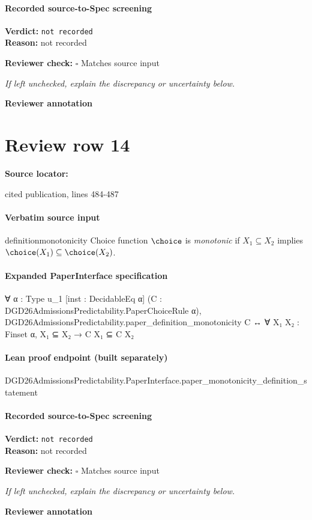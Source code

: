 \documentclass[10pt]{article}
\newcommand{\reviewerbox}{%
  \par\noindent\fbox{\parbox{0.96\linewidth}{\rule{0pt}{0.38in}}}\par
}
\newcommand{\reviewmatch}[1]{%
  \par\noindent\textbf{Reviewer check:} $\square$\; #1\par
  \noindent\emph{If left unchecked, explain the discrepancy or uncertainty below.}\par
}
\begin{document}
\paragraph{Recorded source-to-Spec screening}
\textbf{Verdict:} \texttt{not recorded}
\\
\textbf{Reason:} not recorded
\reviewmatch{Matches source input}
\noindent\textbf{Reviewer annotation}\par
\reviewerbox
\clearpage
\hypertarget{source-claim-1b6dc1033989d2bf}{}
\section*{Review row 14}
\textbf{Source locator:} {\footnotesize\raggedright cited publication, lines 484-\allowbreak{}487\par}
\paragraph{Verbatim source input}
\begin{ReviewVerbatim}
\begin{restatable}[Monotonicity]{definition}{monotonicity}
\label{def:monotonicity}
Choice function $\choice$ is \textit{monotonic} if $X_1 \subseteq X_2$ implies $\choice(X_1) \subseteq \choice(X_2)$.
\end{restatable}
\end{ReviewVerbatim}


\paragraph{Expanded PaperInterface specification}
\begin{ReviewVerbatim}
∀ {α : Type u_1} [inst : DecidableEq α] (C : DGD26AdmissionsPredictability.PaperChoiceRule α),
  DGD26AdmissionsPredictability.paper_definition_monotonicity C ↔ ∀ {X₁ X₂ : Finset α}, X₁ ⊆ X₂ → C X₁ ⊆ C X₂
\end{ReviewVerbatim}

\paragraph{Lean proof endpoint (built separately)}\begin{ReviewVerbatim}
DGD26AdmissionsPredictability.PaperInterface.paper_monotonicity_definition_statement
\end{ReviewVerbatim}

\paragraph{Recorded source-to-Spec screening}
\textbf{Verdict:} \texttt{not recorded}
\\
\textbf{Reason:} not recorded
\reviewmatch{Matches source input}
\noindent\textbf{Reviewer annotation}\par
\reviewerbox
\clearpage
\hypertarget{source-claim-899ae3aec5210e2c}{}
\end{document}

